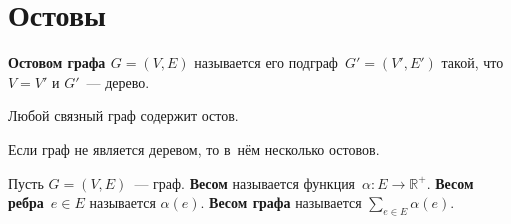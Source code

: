 \section{Остовы}
 \textbf{Остовом графа $G = (V, E)$} называется его подграф~$G' = (V', E')$ такой, что $V = V'$ и $G'$~--- дерево.

\begin{statement}
Любой связный граф содержит остов.
\end{statement}

\begin{statement}
Если граф не является деревом, то в~нём несколько остовов.
\end{statement}

Пусть $G = (V, E)$~--- граф.
\textbf{Весом} называется функция~$\alpha \colon E \to \mathbb R^+$.
\textbf{Весом ребра}~$e \in E$ называется $\alpha(e)$.
 \textbf{Весом графа} называется $\displaystyle \sum_{e \in E} \alpha(e)$.

